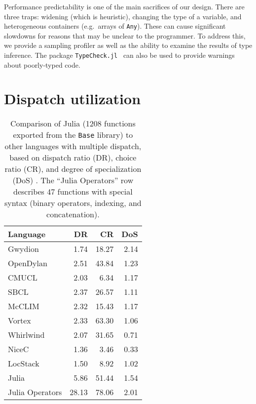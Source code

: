 Performance predictability is one of the main sacrifices of our design.
There are three traps: widening (which is heuristic), changing the type
of a variable, and heterogeneous containers (e.g.\ arrays of \texttt{Any}).
These can cause significant slowdowns for reasons that may be unclear to
the programmer.
To address this, we provide a sampling profiler as well as the ability to
examine the results of type inference.
The package \texttt{TypeCheck.jl}~\cite{typecheckjl} can also be used to
provide warnings about poorly-typed code.



\section{Dispatch utilization}

\begin{table}[!t]
\begin{center}
\begin{tabular}{|l|r|r|r|}\hline
\textbf{Language} & \textbf{DR} & \textbf{CR} & \textbf{DoS} \\
\hline \hline
Gwydion    & 1.74 & 18.27 & 2.14 \\
\hline
OpenDylan  & 2.51 & 43.84 & 1.23 \\
\hline
CMUCL      & 2.03 &  6.34 & 1.17 \\
\hline
SBCL       & 2.37 & 26.57 & 1.11 \\
\hline
McCLIM     & 2.32 & 15.43 & 1.17 \\
\hline
Vortex     & 2.33 & 63.30 & 1.06 \\
\hline
Whirlwind  & 2.07 & 31.65 & 0.71 \\
\hline
NiceC      & 1.36 &  3.46 & 0.33 \\
\hline
LocStack   & 1.50 &  8.92 & 1.02 \\
\hline
Julia      & 5.86 & 51.44 & 1.54 \\
\hline
Julia Operators & 28.13 & 78.06 & 2.01 \\
\hline
\end{tabular}
\end{center}
\caption[Multiple dispatch use statistics]{
\small{
Comparison of Julia (1208 functions exported from the \texttt{Base} library)
to other languages with multiple dispatch, based on dispatch ratio (DR),
choice ratio (CR), and degree of specialization (DoS) \cite{multipledispatch}.
The ``Julia Operators'' row describes 47 functions with special syntax
(binary operators, indexing, and concatenation).
}
}
\label{dispatchratios}
\end{table}

